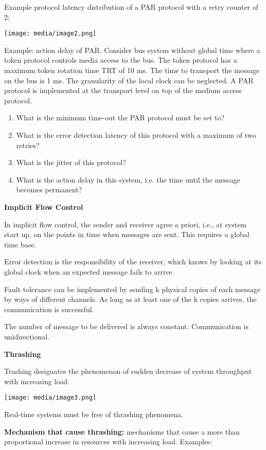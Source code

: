 Example protocol latency distribution of a PAR protocol with a retry
counter of 2:

\texttt{[image: media/image2.png]}

Example: action delay of PAR. Consider bus system without global time
where a token protocol controls media access to the bus. The token
protocol has a maximum token rotation time TRT of 10 ms. The time to
transport the message on the bus is 1 ms. The granularity of the local
clock can be neglected. A PAR protocol is implemented at the transport
level on top of the medium access protocol.

\begin{enumerate}
\def\labelenumi{\arabic{enumi}.}
\item
  What is the minimum time-out the PAR protocol must be set to?
\item
  What is the error detection latency of this protocol with a maximum of
  two retries?
\item
  What is the jitter of this protocol?
\item
  What is the action delay in this system, i.e. the time until the
  message becomes permanent?
\end{enumerate}

\textbf{Implicit Flow Control}

In implicit flow control, the sender and receiver agree a priori, i.e.,
at system start up, on the points in time when messages are sent. This
requires a global time base.

Error detection is the responsibility of the receiver, which knows by
looking at its global clock when an expected message fails to arrive.

Fault tolerance can be implemented by sending k physical copies of each
message by ways of different channels. As long as at least one of the k
copies arrives, the communication is successful.

The number of message to be delivered is always constant. Communication
is unidirectional.

\textbf{Thrashing}

Trashing designates the phenomenon of sudden decrease of system
throughput with increasing load.

\texttt{[image: media/image3.png]}

Real-time systems must be free of thrashing phenomena.

\textbf{Mechanism that cause thrashing:} mechanisms that cause a more
than proportional increase in resources with increasing load. Examples:

